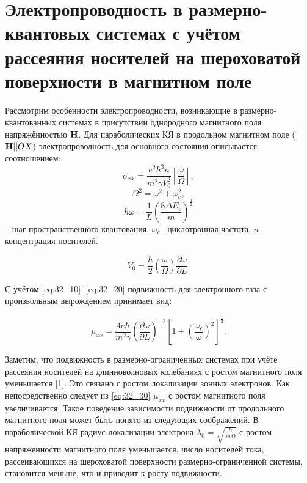 \section{ Электропроводность в размерно-квантовых системах с учётом рассеяния носителей на шероховатой поверхности в магнитном поле}

Рассмотрим особенности электропроводности, возникающие в размерно-квантованных системах в присутствии однородного магнитного поля напряжённостью $\boldsymbol{\mathbf{H}}$. Для параболических КЯ в продольном магнитном поле ($\boldsymbol{\mathbf{H}} || OX$) электропроводность для основного состояния описывается соотношением:
\begin{equation} \label{eq:32_10}
\sigma _{xx} =\frac{e^{2} \hbar ^{3} n}{m^{2} \gamma V_{0}^{2} } \left[\frac{\omega }{\Omega } \right],
 \end{equation}
\[
\Omega ^{2} =\omega ^{2} +\omega _{c}^{2},
\] 
\[
\hbar \omega =\frac{1}{L} \left(\frac{8\Delta E_{c} }{m} \right)^{\frac{1}{2} } 
\]
-- шаг пространственного квантования, $\omega _{c} $-- циклотронная частота, $n$-- концентрация носителей.

\begin{equation} \label{eq:32_20}
V_{0} =\frac{\hbar }{2} \left(\frac{\omega }{\Omega } \right)\frac{\partial \omega }{\partial L} .
\end{equation}

С учётом \eqref{eq:32_10}, \eqref{eq:32_20} подвижность для электронного газа с произвольным вырождением принимает вид:

\begin{equation} \label{eq:32_30}
\mu _{xx} =\frac{4e\hbar }{m^{2} \gamma } \left(\frac{\partial \omega }{\partial L} \right)^{-2} \left[1+\left(\frac{\omega _{c} }{\omega } \right)^{2} \right]^{\frac{1}{2} }.
\end{equation}

Заметим, что подвижность в размерно-ограниченных системах при учёте рассеяния носителей на длинноволновых колебаниях с ростом магнитного поля уменьшается \cite{Sinyavskii1998}[1]. Это связано с ростом локализации зонных электронов. Как непосредственно следует из \eqref{eq:32_30} $\mu _{xx} $ с ростом магнитного поля увеличивается. Такое поведение зависимости подвижности от продольного магнитного поля может быть понято из следующих соображений. В параболической КЯ радиус локализации электрона $\lambda _{0} =\sqrt{\frac{\hbar }{m\Omega } } $ с ростом напряженности магнитного поля уменьшается, число носителей тока, рассеивающихся на шероховатой поверхности размерно-ограниченной системы, становится меньше, что и приводит к росту подвижности.

